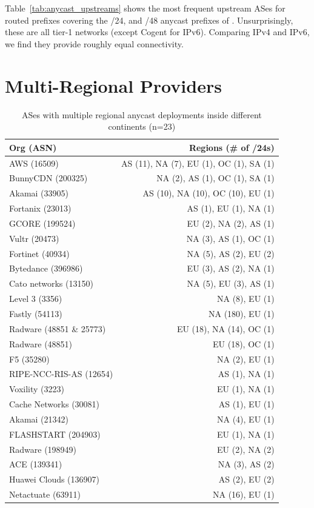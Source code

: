 

Table~\ref{tab:anycast_upstreams}
shows the most frequent upstream ASes for routed prefixes covering the /24, and /48 anycast prefixes of \laces.
%
Unsurprisingly, these are all tier-1 networks (except Cogent for IPv6). %
%
Comparing IPv4 and IPv6, we find they provide roughly equal connectivity.

\section{Multi-Regional Providers}\label{sec:regional-anycast}

\begin{table}[H]
    \centering
    \caption{ASes with multiple regional anycast deployments inside different continents (n=\num{23})}
    \begin{tabular}{lr}
        \toprule
        Org (ASN) & Regions (\# of /24s) \\
        \midrule
        AWS (16509) & AS (11), NA (7), EU (1), OC (1), SA (1) \\
        BunnyCDN (200325) & NA (2), AS (1), OC (1), SA (1) \\
        Akamai (33905) & AS (10), NA (10), OC (10), EU (1) \\
        Fortanix (23013) & AS (1), EU (1), NA (1) \\
        GCORE (199524) & EU (2), NA (2), AS (1) \\
        Vultr (20473) & NA (3), AS (1), OC (1) \\
        Fortinet (40934) & NA (5), AS (2), EU (2) \\
        Bytedance (396986) & EU (3), AS (2), NA (1) \\
        Cato networks (13150) & NA (5), EU (3), AS (1) \\
        Level 3 (3356) & NA (8), EU (1) \\
        Fastly (54113) & NA (180), EU (1) \\
        Radware (48851 \& 25773) & EU (18), NA (14), OC (1) \\
        Radware (48851) & EU (18), OC (1) \\
        F5 (35280) & NA (2), EU (1) \\
        RIPE-NCC-RIS-AS (12654) & AS (1), NA (1) \\
        Voxility (3223) & EU (1), NA (1) \\
        Cache Networks (30081) & AS (1), EU (1) \\
        Akamai (21342) & NA (4), EU (1) \\
        FLASHSTART (204903) & EU (1), NA (1) \\
        Radware (198949) & EU (2), NA (2) \\
        ACE (139341) & NA (3), AS (2) \\
        Huawei Clouds (136907) & AS (2), EU (2) \\
        Netactuate (63911) & NA (16), EU (1) \\
        \bottomrule
    \end{tabular}
    \label{tab:anycast_multi_continent}
\end{table}

